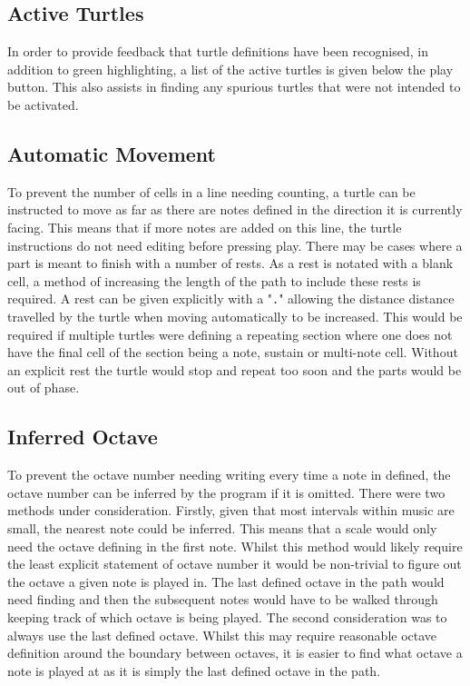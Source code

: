 \subsection{Active Turtles}

In order to provide feedback that turtle definitions have been recognised, in addition to green highlighting, a list of the active turtles is given below the play button. This also assists in finding any spurious turtles that were not intended to be activated.

\subsection{Automatic Movement}

To prevent the number of cells in a line needing counting, a turtle can be instructed to move as far as there are notes defined in the direction it is currently facing. This means that if more notes are added on this line, the turtle instructions do not need editing before pressing play. There may be cases where a part is meant to finish with a number of rests. As a rest is notated with a blank cell, a method of increasing the length of the path to include these rests is required. A rest can be given explicitly with a "\texttt{.}" allowing the distance distance travelled by the turtle when moving automatically to be increased. This would be required if multiple turtles were defining a repeating section where one does not have the final cell of the section being a note, sustain or multi-note cell. Without an explicit rest the turtle would stop and repeat too soon and the parts would be out of phase.

\subsection{Inferred Octave}

To prevent the octave number needing writing every time a note in defined, the octave number can be inferred by the program if it is omitted. There were two methods under consideration. Firstly, given that most intervals within music are small, the nearest note could be inferred. This means that a scale would only need the octave defining in the first note. Whilst this method would likely require the least explicit statement of octave number it would be non-trivial to figure out the octave a given note is played in. The last defined octave in the path would need finding and then the subsequent notes would have to be walked through keeping track of which octave is being played. The second consideration was to always use the last defined octave. Whilst this may require reasonable octave definition around the boundary between octaves, it is easier to find what octave a note is played at as it is simply the last defined octave in the path.

